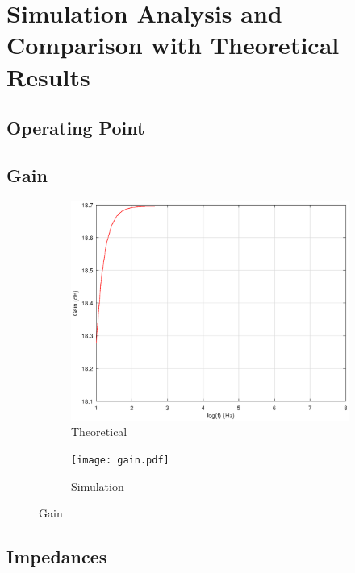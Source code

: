 \section{Simulation Analysis and Comparison with Theoretical Results}
\label{sec:simulation}


\subsection{Operating Point}

\subsection{Gain}


\begin{figure}[H]
\centering
\begin{subfigure}{.5\textwidth}
    \centering
    \vspace{2.8 cm}
    \includegraphics[scale=0.4]{Gain.eps}
    \caption{Theoretical}
\end{subfigure}
\begin{subfigure}{.4\textwidth}
    \centering
    \texttt{[image: gain.pdf]}
    \caption{Simulation}
\end{subfigure}
\caption{Gain}
\label{fig:Gain}
\end{figure}



\subsection{Impedances}


